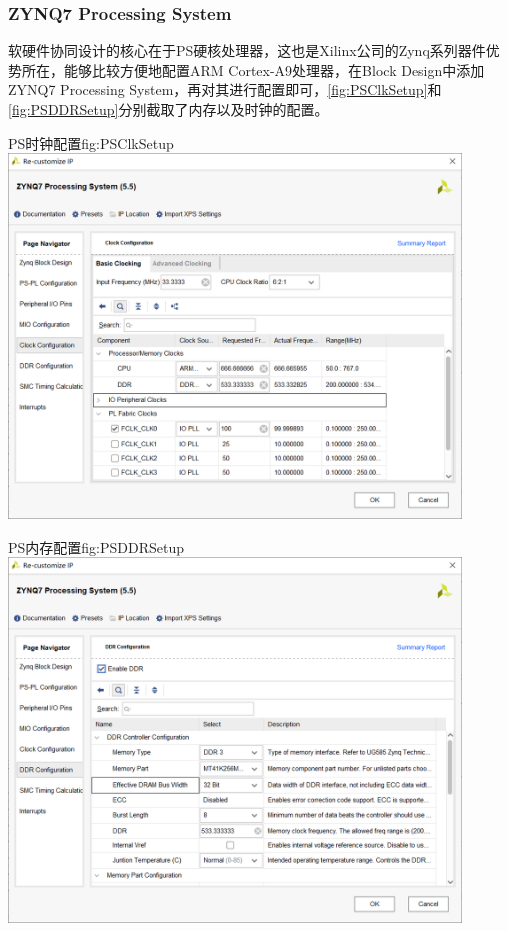 \documentclass[supercite]{HustGraduPaper}
\begin{document}
	\subsubsection{ZYNQ7 Processing System}
	软硬件协同设计的核心在于PS硬核处理器，这也是Xilinx公司的Zynq系列器件优势所在，能够比较方便地配置ARM Cortex-A9处理器，在Block Design中添加ZYNQ7 Processing System，再对其进行配置即可，\autoref{fig:PSClkSetup}和\autoref{fig:PSDDRSetup}分别截取了内存以及时钟的配置。
	
	\begin{generalfig}[htb]{PS时钟配置}{fig:PSClkSetup}
		\includegraphics[width=12cm]{Figures/PSClkSetup.png}
	\end{generalfig}

	\begin{generalfig}[htb]{PS内存配置}{fig:PSDDRSetup}
		\includegraphics[width=12cm]{Figures/PSDDRSetup.png}
	\end{generalfig}
	
\end{document}
